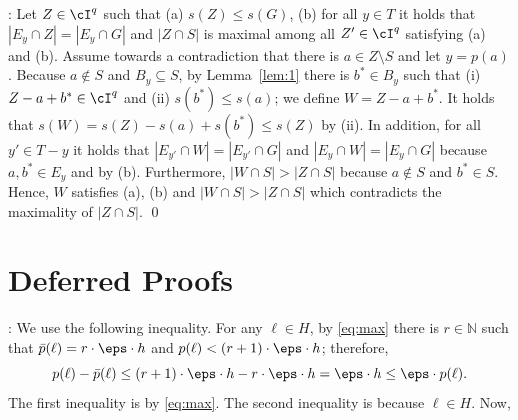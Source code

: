 		
		


	:  Let $Z \in \cI^q$ such that (a) $s(Z) \leq s(G)$, (b)  for all $y \in T$ it holds that $|E_y \cap Z| = |E_y \cap G|$ and $|Z \cap S|$ is maximal among all $Z' \in \cI^q$ satisfying (a) and (b). Assume towards a contradiction that there is $a \in Z \setminus S$ and let $y = p(a)$.  Because $a \notin S$ and $B_y \subseteq S$, by Lemma~\ref{lem:1} there is $b^* \in B_y$ such that (i) $Z-a+b^* \in \cI^q$ and (ii) $s(b^*) \leq s(a)$; we define $W = Z-a+b^*$. It holds that $s(W) = s(Z)-s(a)+s(b^*) \leq s(Z)$ by (ii). In addition, for all $y' \in T -y$ it holds that $|E_{y'} \cap W| = |E_{y'} \cap G|$ and $|E_{y} \cap W| = |E_{y} \cap G|$ because $a, b^* \in E_y$ and by (b). Furthermore, $|W \cap S| > |Z \cap S|$ because $a \notin S$ and $b^* \in S$. Hence, $W$ satisfies (a), (b) and $|W \cap S| > |Z \cap S|$ which contradicts the maximality of $|Z \cap S|$. \qed

\section{Deferred Proofs}
\label{sec:proofs}


	: 
	We use the following inequality. For any $\ell \in H$, by \eqref{eq:max} there is $r \in \mathbb{N}$ such that $\bar{p}(\ell) = r \cdot \eps \cdot h$ and $p(\ell) < (r+1) \cdot \eps \cdot h$; therefore,  		\begin{equation}
			\label{claim:1}
			p(\ell)-\bar{p}(\ell) \leq (r+1) \cdot \eps \cdot h- r \cdot \eps \cdot h =  \eps \cdot h \leq \eps \cdot p(\ell).
		\end{equation} The first inequality is by \eqref{eq:max}. The second inequality is because $\ell \in H$. Now, 


